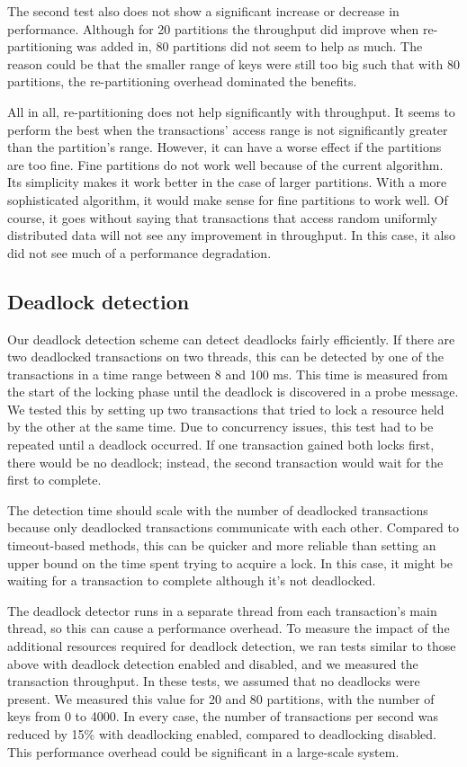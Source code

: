 \documentclass[a4paper, 10pt, notitlepage]{article}
\begin{document}
The second test also does not show a significant increase or decrease in performance. Although for 20 partitions 
the throughput did improve when re-partitioning was added in, 80 partitions did not seem to help as much. The reason
could be that the smaller range of keys were still too big such that with 80 partitions, the re-partitioning
overhead dominated the benefits.

All in all, re-partitioning does not help significantly with throughput. It seems to perform the best when 
the transactions' access range is not significantly greater than the partition's range. However, it can have
a worse effect if the partitions are too fine. Fine partitions do not work well because of the current algorithm.
Its simplicity makes it work better in the case of larger partitions. With a more sophisticated algorithm,
it would make sense for fine partitions to work well. Of course, it goes without saying that transactions that
access random uniformly distributed data will not see any improvement in throughput. In this case, it also
did not see much of a performance degradation.

\subsection{Deadlock detection}
Our deadlock detection scheme can detect deadlocks fairly efficiently. If there are two deadlocked transactions on two threads, this can be detected by one of the transactions in a time range between 8 and 100 ms. This time is measured from the start of the locking phase until the deadlock is discovered in a probe message. We tested this by setting up two transactions that tried to lock a resource held by the other at the same time. Due to concurrency issues, this test had to be repeated until a deadlock occurred. If one transaction gained both locks first, there would be no deadlock; instead, the second transaction would wait for the first to complete.

The detection time should scale with the number of deadlocked transactions because only deadlocked transactions communicate with each other. Compared to timeout-based methods, this can be quicker and more reliable than setting an upper bound on the time spent trying to acquire a lock. In this case, it might be waiting for a transaction to complete although it's not deadlocked.

The deadlock detector runs in a separate thread from each transaction's main thread, so this can cause a performance overhead. To measure the impact of the additional resources required for deadlock detection, we ran tests similar to those above with deadlock detection enabled and disabled, and we measured the transaction throughput. In these tests, we assumed that no deadlocks were present. We measured this value for 20 and 80 partitions, with the number of keys from 0 to 4000. In every case, the number of transactions per second was reduced by 15\% with deadlocking enabled, compared to deadlocking disabled. This performance overhead could be significant in a large-scale system.
\end{document}
